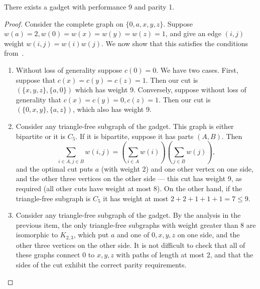 \documentclass[a4paper,11pt, DIV=11]{scrartcl}
\theoremstyle{plain}
\theoremstyle{definition}
\begin{document}
\begin{lemma}
    There exists a gadget with performance 9 and parity 1.
\end{lemma}
\begin{proof}
    Consider the complete graph on $\{ 0, a, x, y, z\}$. Suppose $w(a) = 2, w(0) = w(x) = w(y) = w(z) = 1$, and give an edge $(i, j)$ weight $w(i, j) = w(i) w(j)$. We now show that this satisfies the conditions from~.
    \begin{enumerate}
    \item Without loss of generality suppose $c(0) = 0$. We have two cases. First, suppose that $c(x) = c(y) = c(z) = 1$. Then our cut is $(\{ x, y, z\}, \{ a, 0 \})$ which has weight 9. Conversely, suppose without loss of generality that $c(x) = c(y) = 0, c(z) = 1$. Then our cut is $(\{ 0, x, y \}, \{ a, z \})$, which also has weight 9.
    \item Consider any triangle-free subgraph of the gadget. This graph is either bipartite or it is $C_5$. If it is bipartite, suppose it has parts $(A, B)$. Then
    \[
    \sum_{i \in A, j \in B} w(i, j) = \left(\sum_{i \in A} w(i)\right)\left(\sum_{j \in B} w(j) \right),
    \]
    and the optimal cut puts $a$ (with weight 2) and one other vertex on one side, and the other three vertices on the other side --- this cut has weight 9, as required (all other cuts have weight at most 8). On the other hand, if the triangle-free subgraph is $C_5$ it has weight at most $2 + 2 + 1 + 1 + 1 = 7 \leq 9$.
    \item Consider any triangle-free subgraph of the gadget. By the analysis in the previous item, the only triangle-free subgraphs with weight greater than 8 are isomorphic to $K_{2,3}$, which put $a$ and one of $0, x, y, z$ on one side, and the other three vertices on the other side. It is not difficult to check that all of these graphs connect $0$ to $x, y, z$ with paths of length at most 2, and that the sides of the cut exhibit the correct parity requirements.\qedhere
    \end{enumerate}
\end{proof}
\end{document}
